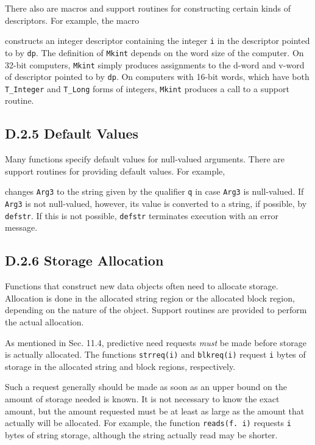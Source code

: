 There also are macros and support routines for constructing certain
kinds of descriptors. For example, the macro


\noindent
constructs an integer descriptor containing the integer \texttt{i} in the
descriptor pointed to by \texttt{dp}. The definition of \texttt{\color{red}Mkint}
depends on the word size of the computer. On 32-bit computers,
\texttt{\color{red}Mkint} simply produces assignments to the d-word and v-word of
descriptor pointed to by \texttt{dp}. On computers with 16-bit words, which
have both \texttt{T\_Integer} and \texttt{T\_Long} forms of integers,
\texttt{\color{red}Mkint} produces a call to a support routine.

\subsection[D.2.5 Default Values]{D.2.5 Default Values}

Many functions specify default values for null-valued arguments. There
are support routines for providing default values. For example,



\noindent
changes \texttt{Arg3} to the string given by the qualifier \texttt{q} in
case \texttt{Arg3} is null-valued. If \texttt{Arg3} is not null-valued,
however, its value is converted to a string, if possible, by
\texttt{\color{red}defstr}. If this is not possible, \texttt{\color{red}defstr} terminates
execution with an error message.

\subsection[D.2.6 Storage Allocation]{D.2.6 Storage Allocation}

Functions that construct new data objects often need to allocate
storage. Allocation is done in the allocated string region or the
allocated block region, depending on the nature of the object. Support
routines are provided to perform the actual allocation.

As mentioned in Sec. 11.4, predictive need requests \textit{must} be made
before storage is actually allocated. The functions \texttt{strreq(i)} and
\texttt{blkreq(i)} request \texttt{i} bytes of storage in the allocated
string and block regions, respectively.

Such a request generally should be made as soon as an upper bound on the
amount of storage needed is known. It is not necessary to know the exact
amount, but the amount requested must be at least as large as the amount
that actually will be allocated. For example, the function
\texttt{reads(f. i)} requests \texttt{i} bytes of string storage, although
the string actually read may be shorter.


